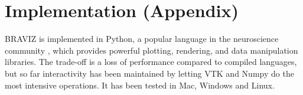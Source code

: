 \documentclass[utf8,paper]{frontiersSCNS} %
\begin{document}
%
%
%






\section*{Implementation (Appendix)}

BRAVIZ is implemented in Python, a popular language in the neuroscience community \citep{gorgolewski_nipype:_2011, garyfallidis_dipy_2014}, which provides powerful plotting, rendering, and data manipulation libraries. The trade-off is a loss of performance compared to compiled languages, but so far interactivity has been maintained by letting VTK\citep{schroeder_vtk_1998} and Numpy\citep{van_der_walt_numpy_2011} do the most intensive operations. It has been tested in Mac, Windows and Linux.
\end{document}
